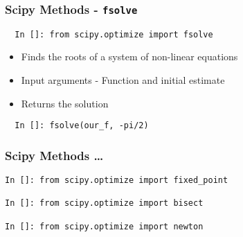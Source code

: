 \documentclass[14pt,compress]{beamer}
\newcommand{\typ}[1]{\lstinline{#1}}
\begin{document}
\begin{frame}[fragile]
\frametitle{Scipy Methods - \typ{fsolve}}
\begin{small}
\begin{lstlisting}
  In []: from scipy.optimize import fsolve
\end{lstlisting}
\end{small}
\begin{itemize}
\item Finds the roots of a system of non-linear equations
\item Input arguments - Function and initial estimate
\item Returns the solution
\end{itemize}
\begin{lstlisting}
  In []: fsolve(our_f, -pi/2)
\end{lstlisting}
\end{frame}

\begin{frame}[fragile]
\frametitle{Scipy Methods \dots}
\small{
\begin{lstlisting}
In []: from scipy.optimize import fixed_point

In []: from scipy.optimize import bisect

In []: from scipy.optimize import newton
\end{lstlisting}}
\end{frame}
\end{document}
